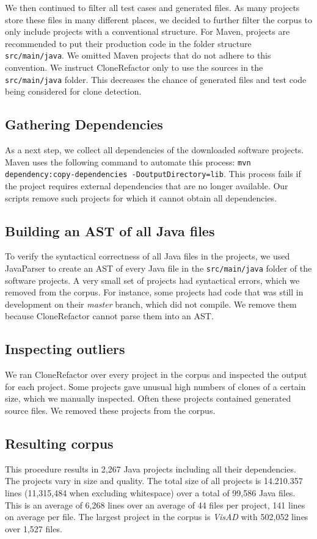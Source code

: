 We then continued to filter all test cases and generated files. As many projects store these files in many different places, we decided to further filter the corpus to only include projects with a conventional structure. For Maven, projects are recommended to put their production code in the folder structure \texttt{src/main/java}. We omitted Maven projects that do not adhere to this convention. We instruct CloneRefactor only to use the sources in the \texttt{src/main/java} folder. This decreases the chance of generated files and test code being considered for clone detection.

\subsection{Gathering Dependencies}
As a next step, we collect all dependencies of the downloaded software projects. Maven uses the following command to automate this process: \texttt{mvn dependency:copy-dependencies -DoutputDirectory=lib}. This process fails if the project requires external dependencies that are no longer available. Our scripts remove such projects for which it cannot obtain all dependencies.

\subsection{Building an AST of all Java files}
To verify the syntactical correctness of all Java files in the projects, we used JavaParser \cite{tomassetti2017javaparser} to create an AST of every Java file in the \texttt{src/main/java} folder of the software projects. A very small set of projects had syntactical errors, which we removed from the corpus. For instance, some projects had code that was still in development on their \textit{master} branch, which did not compile. We remove them because CloneRefactor cannot parse them into an AST.

\subsection{Inspecting outliers}
We ran CloneRefactor over every project in the corpus and inspected the output for each project. Some projects gave unusual high numbers of clones of a certain size, which we manually inspected. Often these projects contained generated source files. We removed these projects from the corpus.

\subsection{Resulting corpus}
This procedure results in 2,267 Java projects including all their dependencies. The projects vary in size and quality. The total size of all projects is 14.210.357 lines (11,315,484 when excluding whitespace) over a total of 99,586 Java files. This is an average of 6,268 lines over an average of 44 files per project, 141 lines on average per file. The largest project in the corpus is \textit{VisAD} with 502,052 lines over 1,527 files.

